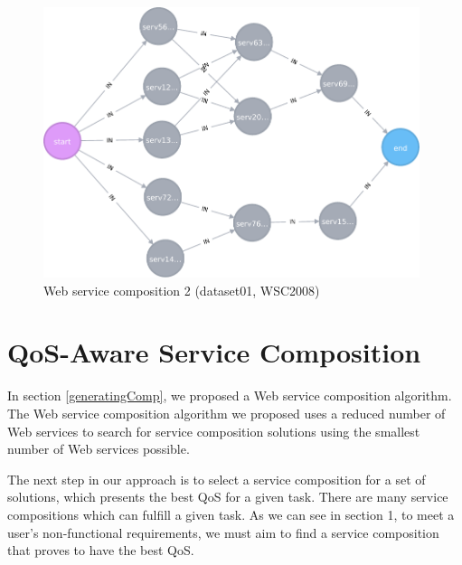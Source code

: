 \begin{figure}[h]
\includegraphics[width=11cm]{svg-composition2.pdf}
\centering
\caption{Web service composition 2 (dataset01, WSC2008)}
\label{fig:compEg2} 
\end{figure} 

\section{QoS-Aware Service Composition}

In section \ref{generatingComp}, we proposed a Web service composition algorithm. The Web service composition algorithm we proposed uses a reduced number of Web services to search for service composition solutions using the smallest number of Web services possible.\par

The next step in our approach is to select a service composition for a set of solutions, which presents the best QoS for a given task. There are many service compositions which can fulfill a given task. As we can see in section 1, to meet a user's non-functional requirements, we must aim to find a service composition that proves to have the best QoS.\par

